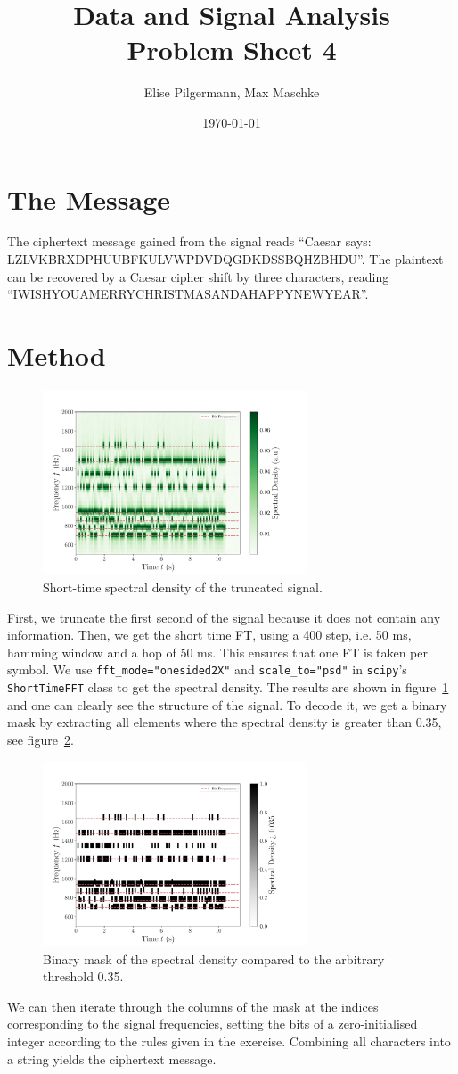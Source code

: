 \documentclass[a4paper,DIV=12,english]{scrartcl}
\title{Data and Signal Analysis\\Problem Sheet 4}
\author{Elise Pilgermann, Max Maschke}
\date{\today}
\begin{document}
\maketitle

\section{The Message}
The ciphertext message gained from the signal reads \enquote{Caesar says: LZLVKBRXDPHUUBFKULVWPDVDQGDKDSSBQHZBHDU}. The plaintext can be recovered by a Caesar cipher shift by three characters, reading \enquote{IWISHYOUAMERRYCHRISTMASANDAHAPPYNEWYEAR}.

\section{Method}
\begin{figure}[h]
    \centering
    \includegraphics[width=0.7\textwidth]{../test.pdf}
    \caption{Short-time spectral density of the truncated signal.}
    \label{fig:stft}
\end{figure}
First, we truncate the first second of the signal because it does not contain any information. Then, we get the short time FT, using a 400 step, i.e. 50 ms, hamming window and a hop of 50 ms. This ensures that one FT is taken per symbol. We use \texttt{fft\_mode="onesided2X"} and \texttt{scale\_to="psd"} in \texttt{scipy}'s \texttt{ShortTimeFFT} class to get the spectral density. The results are shown in figure~\ref{fig:stft} and one can clearly see the structure of the signal. To decode it, we get a binary mask by extracting all elements where the spectral density is greater than 0.35, see figure~\ref{fig:mask}.
\begin{figure}
    \centering
    \includegraphics[width=0.7\textwidth]{../test2.pdf}
    \caption{Binary mask of the spectral density compared to the arbitrary threshold 0.35.}
    \label{fig:mask}
\end{figure}
We can then iterate through the columns of the mask at the indices corresponding to the signal frequencies, setting the bits of a zero-initialised integer according to the rules given in the exercise. Combining all characters into a string yields the ciphertext message.
\end{document}
